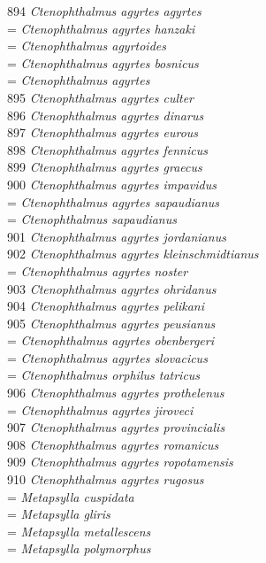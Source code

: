 \documentclass[
]{article}
\begin{document}
894 \emph{Ctenophthalmus agyrtes agyrtes}\\
= \emph{Ctenophthalmus agyrtes hanzaki}\\
= \emph{Ctenophthalmus agyrtoides}\\
= \emph{Ctenophthalmus agyrtes bosnicus}\\
= \emph{Ctenophthalmus agyrtes}\\
895 \emph{Ctenophthalmus agyrtes culter}\\
896 \emph{Ctenophthalmus agyrtes dinarus}\\
897 \emph{Ctenophthalmus agyrtes eurous}\\
898 \emph{Ctenophthalmus agyrtes fennicus}\\
899 \emph{Ctenophthalmus agyrtes graecus}\\
900 \emph{Ctenophthalmus agyrtes impavidus}\\
= \emph{Ctenophthalmus agyrtes sapaudianus}\\
= \emph{Ctenophthalmus sapaudianus}\\
901 \emph{Ctenophthalmus agyrtes jordanianus}\\
902 \emph{Ctenophthalmus agyrtes kleinschmidtianus}\\
= \emph{Ctenophthalmus agyrtes noster}\\
903 \emph{Ctenophthalmus agyrtes ohridanus}\\
904 \emph{Ctenophthalmus agyrtes pelikani}\\
905 \emph{Ctenophthalmus agyrtes peusianus}\\
= \emph{Ctenophthalmus agyrtes obenbergeri}\\
= \emph{Ctenophthalmus agyrtes slovacicus}\\
= \emph{Ctenophthalmus orphilus tatricus}\\
906 \emph{Ctenophthalmus agyrtes prothelenus}\\
= \emph{Ctenophthalmus agyrtes jiroveci}\\
907 \emph{Ctenophthalmus agyrtes provincialis}\\
908 \emph{Ctenophthalmus agyrtes romanicus}\\
909 \emph{Ctenophthalmus agyrtes ropotamensis}\\
910 \emph{Ctenophthalmus agyrtes rugosus}\\
= \emph{Metapsylla cuspidata}\\
= \emph{Metapsylla gliris}\\
= \emph{Metapsylla metallescens}\\
= \emph{Metapsylla polymorphus}\\
\end{document}

